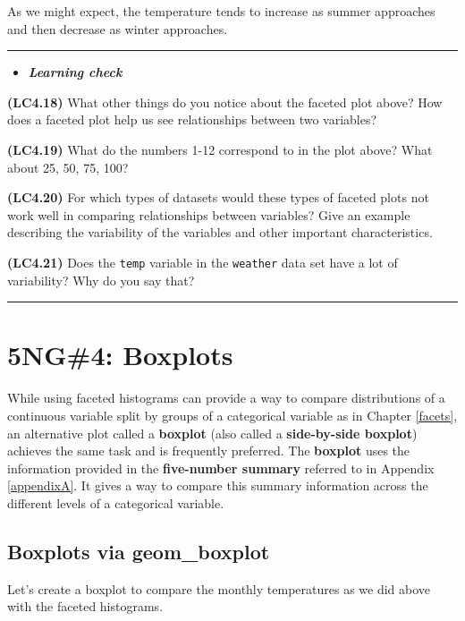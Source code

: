 \documentclass[]{tufte-book}
\let\oldrule=\rule
\renewcommand{\rule}[1]{\oldrule{\linewidth}}
\newenvironment{rmdblock}[1]
  {\begin{shaded*}
  \begin{itemize}
  \renewcommand{\labelitemi}{
    \raisebox{-.7\height}[0pt][0pt]{
    }
  }
  \item
  }
  {
  \end{itemize}
  \end{shaded*}
  }
\newenvironment{learncheck}
  {\begin{rmdblock}{warning}}
  {\end{rmdblock}}
\begin{document}
As we might expect, the temperature tends to increase as summer
approaches and then decrease as winter approaches.

\begin{center}\rule{0.5\linewidth}{\linethickness}\end{center}

\begin{learncheck}
\textbf{\emph{Learning check}}
\end{learncheck}

\textbf{(LC4.18)} What other things do you notice about the faceted plot
above? How does a faceted plot help us see relationships between two
variables?

\textbf{(LC4.19)} What do the numbers 1-12 correspond to in the plot
above? What about 25, 50, 75, 100?

\textbf{(LC4.20)} For which types of datasets would these types of
faceted plots not work well in comparing relationships between
variables? Give an example describing the variability of the variables
and other important characteristics.

\textbf{(LC4.21)} Does the \texttt{temp} variable in the
\texttt{weather} data set have a lot of variability? Why do you say
that?

\begin{center}\rule{0.5\linewidth}{\linethickness}\end{center}

\section{5NG\#4: Boxplots}\label{ng4-boxplots}

While using faceted histograms can provide a way to compare
distributions of a continuous variable split by groups of a categorical
variable as in Chapter \ref{facets}, an alternative plot called a
\textbf{boxplot} (also called a \textbf{side-by-side boxplot}) achieves
the same task and is frequently preferred. The \textbf{boxplot} uses the
information provided in the \textbf{five-number summary} referred to in
Appendix \ref{appendixA}. It gives a way to compare this summary
information across the different levels of a categorical variable.

\subsection{Boxplots via geom\_boxplot}\label{geomboxplot}

Let's create a boxplot to compare the monthly temperatures as we did
above with the faceted histograms.
\end{document}
